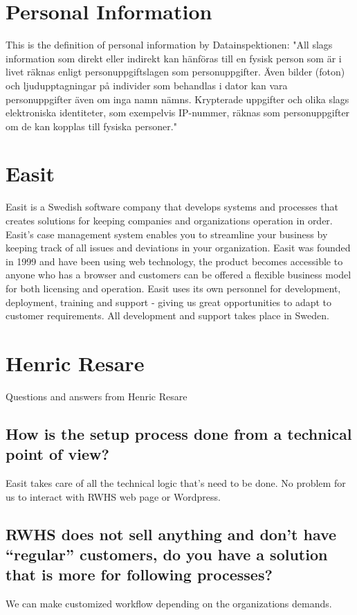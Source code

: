 \onecolumn
\newpage
\twocolumn
\appendices
\section{Personal Information}
\label{app:personal-information}
This is the definition of personal information by Datainspektionen:
"All slags information som direkt eller indirekt kan hänföras till en fysisk person som är i livet räknas enligt personuppgiftslagen som personuppgifter. Även bilder (foton) och ljudupptagningar på individer som behandlas i dator kan vara personuppgifter även om inga namn nämns. Krypterade uppgifter och olika slags elektroniska identiteter, som exempelvis IP-nummer, räknas som personuppgifter om de kan kopplas till fysiska personer." \cite{Datainspektionen2015}

\section{Easit}
\label{app:easit}
Easit is a Swedish software company that develops systems and processes that creates solutions for keeping companies and organizations operation in order. Easit's case management system enables you to streamline your business by keeping track of all issues and deviations in your organization. Easit was founded in 1999 and have been using web technology, the product becomes accessible to anyone who has a browser and customers can be offered a flexible business model for both licensing and operation. Easit uses its own personnel for development, deployment, training and support - giving us great opportunities to adapt to customer requirements. All development and support takes place in Sweden. \cite{Easit}

\section{Henric Resare}
\label{app:henric-resare}
Questions and answers from Henric Resare

\subsection{How is the setup process done from a technical point of view?}
Easit takes care of all the technical logic that’s need to be done. No problem for us to interact with RWHS web page or Wordpress. 

\subsection{RWHS does not sell anything and don’t have “regular” customers, do you have a solution that is more for following processes?} 
We can make customized workflow depending on the organizations demands.

